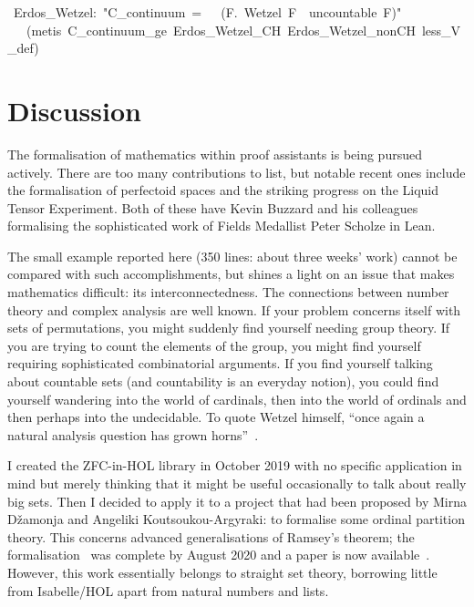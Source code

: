 \documentclass[runningheads]{llncs}
\begin{document}
\begin{isabelle}
\ Erdos\_Wetzel:\ "C\_continuum\ =\ \ \isasymlongleftrightarrow \ (\isasymexists F.\ Wetzel\ F\ \isasymand \ uncountable\ F)"\isanewline
\ \ \ (metis\ C\_continuum\_ge\ Erdos\_Wetzel\_CH\ Erdos\_Wetzel\_nonCH\ less\_V\_def)
\end{isabelle}


\section{Discussion}

The formalisation of mathematics within proof assistants is being pursued actively. There are too many contributions to list, but notable recent ones include the formalisation of perfectoid spaces \cite{buzzard-perfectoid} and the striking progress on the Liquid Tensor Experiment.
Both of these have Kevin Buzzard and his colleagues formalising the sophisticated work of Fields Medallist Peter Scholze in Lean.

The small example reported here (350 lines: about three weeks' work) cannot be compared with such accomplishments, but shines a light on an issue that makes mathematics difficult: its interconnectedness. The connections between number theory and complex analysis are well known. If your problem concerns itself with sets of permutations, you might suddenly find yourself needing group theory. If you are trying to count the elements of the group, you might find yourself requiring sophisticated combinatorial arguments. If you find yourself talking about countable sets (and countability is an everyday notion), you could find yourself wandering into the world of cardinals, then into the world of ordinals and then perhaps into the undecidable. To quote Wetzel himself, ``once again a natural analysis question has grown horns''~\cite[p.]{garcia-wetzels-problem}.

I created the ZFC-in-HOL library in October 2019 with no specific application in mind but merely thinking that it might be useful occasionally to talk about really big sets.
Then I decided to apply it to a project that had been proposed by Mirna Džamonja and Angeliki Koutsoukou-Argyraki: to formalise some ordinal partition theory. This concerns advanced generalisations of Ramsey's theorem; the formalisation~\cite{Ordinal_Partitions-AFP} was complete by August 2020 and a paper is now available~\cite{dzamonja-formalising}.
However, this work essentially belongs to straight set theory, borrowing little from Isabelle/HOL apart from natural numbers and lists.
\end{document}

